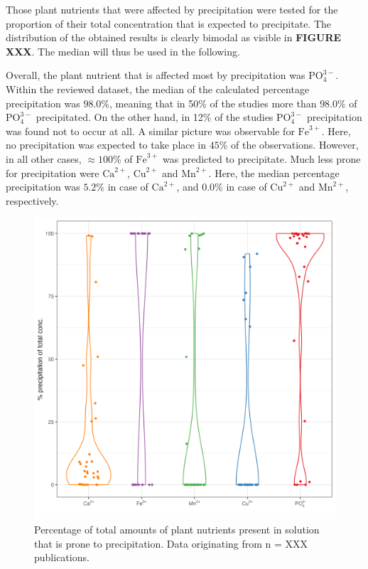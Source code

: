 \documentclass[
]{article}
\begin{document}
Those plant nutrients that were affected by precipitation were tested for the proportion of their total concentration that is expected to precipitate. The distribution of the obtained results is clearly bimodal as visible in \textbf{FIGURE XXX}. The median will thus be used in the following.

Overall, the plant nutrient that is affected most by precipitation was \(\text{PO}_{4}^{3-}\). Within the reviewed dataset, the median of the calculated percentage precipitation was \(98.0\%\), meaning that in 50\% of the studies more than \(98.0\%\) of \(\text{PO}_{4}^{3-}\) precipitated. On the other hand, in 12\% of the studies \(\text{PO}_{4}^{3-}\) precipitation was found not to occur at all.
A similar picture was observable for \(\text{Fe}^{3+}\). Here, no precipitation was expected to take place in \(45\%\) of the observations. However, in all other cases, \(\approx100\%\) of \(\text{Fe}^{3+}\) was predicted to precipitate.
Much less prone for precipitation were \(\text{Ca}^{2+}\), \(\text{Cu}^{2+}\) and \(\text{Mn}^{2+}\). Here, the median percentage precipitation was \(5.2\%\) in case of \(\text{Ca}^{2+}\), and \(0.0\%\) in case of \(\text{Cu}^{2+}\) and \(\text{Mn}^{2+}\), respectively.

\begin{figure}
\centering
\includegraphics{plots/violinplot_precipitated2_vm.png}
\caption{Percentage of total amounts of plant nutrients present in solution that is prone to precipitation. Data originating from n = XXX publications.}
\end{figure}
\end{document}
